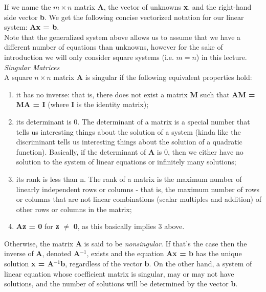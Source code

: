 \documentclass[11pt,a4paper,oneside]{report}
\begin{document}
If we name the $m \times n$ matrix {\bf A}, the vector of unknowns {\bf x}, and the right-hand side vector {\bf b}. We get the following concise vectorized notation for our linear system: {\bf Ax = b}.\\

Note that the generalized system above allows us to assume that we have a different number of equations than unknowns, however for the sake of introduction we will only consider square systems (i.e. $m=n$) in this lecture.\\ 

\pagebreak
{\it\Large\color{red} Singular Matrices}\\

A square $n \times n$ matrix {\bf A} is singular if the following equivalent properties hold:\\
\begin{enumerate}
\setlength{\itemsep}{0pt}
\item it has no inverse: that is, there does not exist a matrix {\bf M} such that {\bf AM = MA = I} (where {\bf I} is the identity matrix);
\item its determinant is 0. The determinant of a matrix is a special number that tells us interesting things about the solution of a system (kinda like the discriminant tells us interesting things about the solution of a quadratic function). Basically, if the determinant of {\bf A} is 0, then we either have no solution to the system of linear equations or infinitely many solutions;
\item its rank is less than n. The rank of a matrix is the maximum number of linearly independent rows or columns - that is, the maximum number of rows or columns that are not linear combinations (scalar multiples and addition) of other rows or columns in the matrix;
\item {\bf Az = 0} for {\bf z} $\neq$ {\bf 0}, as this basically implies 3 above.\\
\end{enumerate} 

Otherwise, the matrix {\bf A} is said to be \emph{nonsingular}. If that's the case then the inverse of {\bf A}, denoted {\bf A}$^{-1}$, exists and the equation {\bf Ax = b} has the unique solution {\bf x = A}$^{-1}${\bf b}, regardless of the vector {\bf b}. On the other hand, a system of linear equation whose coefficient matrix is singular, may or may not have solutions, and the number of solutions will be determined by the vector {\bf b}.
\end{document}
